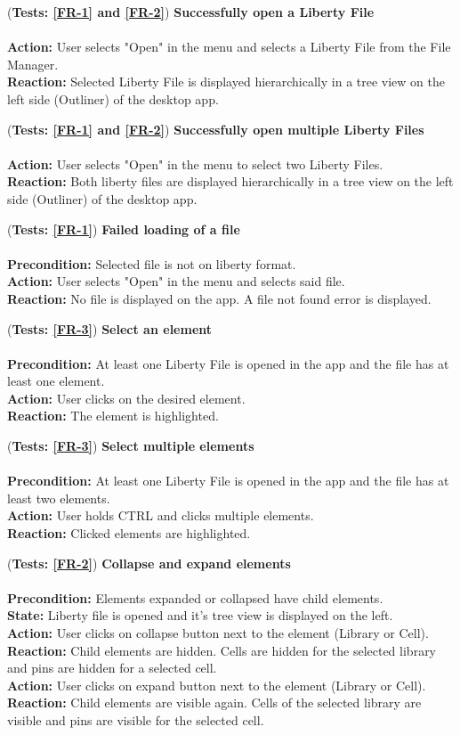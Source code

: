 \documentclass[10pt,a4paper]{report}
\newcommand{\precondition}[1]{
    \textbf{Precondition: } #1 \leavevmode \\
}
\newcommand{\action}[1]{
    \textbf{Action: } #1 \leavevmode \\
}
\newcommand{\state}[1]{
    \textbf{State: } #1 \leavevmode \\
}
\newcommand{\reaction}[1]{
    \textbf{Reaction: } #1 \leavevmode \\
}
\newcommand{\GTCDescription}[2]{
    (\textbf{Tests: #1}) \textbf{#2} \leavevmode \\
}
\begin{document}
\begin{GTC}
    \item \GTCDescription{\ref{FR-1} and \ref{FR-2}}
    {Successfully open a Liberty File} \leavevmode \\ 
        \action{User selects "Open" in the menu and selects a Liberty File from the File Manager.}
        \reaction{Selected Liberty File is displayed hierarchically in a tree view on the left side (Outliner) of the desktop app.} \label{GTC-1}
        
    \item \GTCDescription{\ref{FR-1} and \ref{FR-2}}
    {Successfully open multiple Liberty Files} \leavevmode \\ 
        \action{User selects "Open" in the menu to select two Liberty Files.}
        \reaction{Both liberty files are displayed hierarchically in a tree view on the left side (Outliner) of the desktop app.}\label{GTC-2}
        
    \item \GTCDescription{\ref{FR-1}}
    {Failed loading of a file} \leavevmode \\ 
        \precondition{Selected file is not on liberty format.}
        \action{User selects "Open" in the menu and selects said file.}
        \reaction{No file is displayed on the app. A file not found error is displayed.}\label{GTC-3}
        
    \item \GTCDescription{\ref{FR-3}}
    {Select an element} \leavevmode \\ 
        \precondition{At least one Liberty File is opened in the app and the file has at least one element.}
        \action{User clicks on the desired element.}
        \reaction{The element is highlighted.}\label{GTC-4}
        
    \item \GTCDescription{\ref{FR-3}}
    {Select multiple elements} \leavevmode \\ 
        \precondition{At least one Liberty File is opened in the app and the file has at least two elements.}
        \action{User holds CTRL and clicks multiple elements.}
        \reaction{Clicked elements are highlighted.}\label{GTC-5}
        
        
    \item \GTCDescription{\ref{FR-2}}
    {Collapse and expand elements} \leavevmode \\ 
        \precondition{Elements expanded or collapsed have child elements.}
        \state{Liberty file is opened and it's tree view is displayed on the left.}
        \action{User clicks on collapse button next to the element (Library or Cell).}
        \reaction{Child elements are hidden. Cells are hidden for the selected library and pins are hidden for a selected cell.}
        \action{User clicks on expand button next to the element (Library or Cell).}
        \reaction{Child elements are visible again. Cells of the selected library are visible and pins are visible for the selected cell.}\label{GTC-6}
    

\end{GTC}
\end{document}

